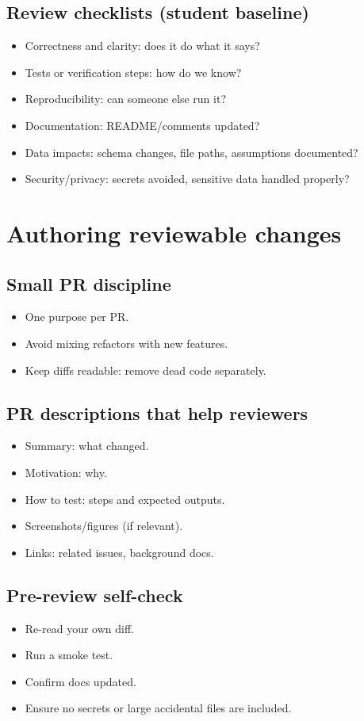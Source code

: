 \subsection{Review checklists (student baseline)}
\begin{itemize}
\item Correctness and clarity: does it do what it says?
\item Tests or verification steps: how do we know?
\item Reproducibility: can someone else run it?
\item Documentation: README/comments updated?
\item Data impacts: schema changes, file paths, assumptions documented?
\item Security/privacy: secrets avoided, sensitive data handled properly?
\end{itemize}

\section{Authoring reviewable changes}
\subsection{Small PR discipline}
\begin{itemize}
\item One purpose per PR.
\item Avoid mixing refactors with new features.
\item Keep diffs readable: remove dead code separately.
\end{itemize}

\subsection{PR descriptions that help reviewers}
\begin{itemize}
\item Summary: what changed.
\item Motivation: why.
\item How to test: steps and expected outputs.
\item Screenshots/figures (if relevant).
\item Links: related issues, background docs.
\end{itemize}

\subsection{Pre-review self-check}
\begin{itemize}
\item Re-read your own diff.
\item Run a smoke test.
\item Confirm docs updated.
\item Ensure no secrets or large accidental files are included.
\end{itemize}

